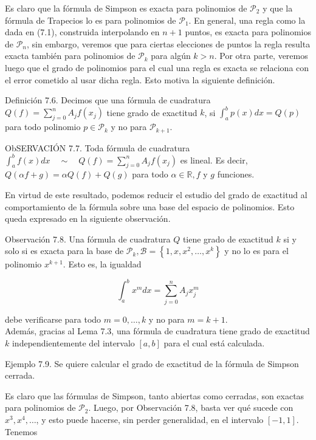 \documentclass[10pt]{article}
\begin{document}
Es claro que la fórmula de Simpson es exacta para polinomios de $\mathcal{P}_{2}$ y que la fórmula de Trapecios lo es para polinomios de $\mathcal{P}_{1}$. En general, una regla como la dada en (7.1), construida interpolando en $n+1$ puntos, es exacta para polinomios de $\mathcal{P}_{n}$, sin embargo, veremos que para ciertas elecciones de puntos la regla resulta exacta también para polinomios de $\mathcal{P}_{k}$ para algún $k>n$. Por otra parte, veremos luego que el grado de polinomios para el cual una regla es exacta se relaciona con el error cometido al usar dicha regla. Esto motiva la siguiente definición.

Definición 7.6. Decimos que una fórmula de cuadratura $Q(f)=\sum_{j=0}^{n} A_{j} f\left(x_{j}\right)$ tiene grado de exactitud $k$, si $\int_{a}^{b} p(x) d x=Q(p)$ para todo polinomio $p \in \mathcal{P}_{k}$ y no para $\mathcal{P}_{k+1}$.

ObSERVACIÓN 7.7. Toda fórmula de cuadratura $\int_{a}^{b} f(x) d x \quad \sim \quad Q(f)=\sum_{j=0}^{n} A_{j} f\left(x_{j}\right)$ es lineal. Es decir, $Q(\alpha f+g)=\alpha Q(f)+Q(g)$ para todo $\alpha \in \mathbb{R}, f$ y $g$ funciones.

En virtud de este resultado, podemos reducir el estudio del grado de exactitud al comportamiento de la fórmula sobre una base del espacio de polinomios. Esto queda expresado en la siguiente observación.

Observación 7.8. Una fórmula de cuadratura $Q$ tiene grado de exactitud $k$ si y solo si es exacta para la base de $\mathcal{P}_{k}, \mathcal{B}=\left\{1, x, x^{2}, \ldots, x^{k}\right\}$ y no lo es para el polinomio $x^{k+1}$. Esto es, la igualdad

$$
\int_{a}^{b} x^{m} d x=\sum_{j=0}^{n} A_{j} x_{j}^{m}
$$

debe verificarse para todo $m=0, \ldots, k$ y no para $m=k+1$.\\
Además, gracias al Lema 7.3, una fórmula de cuadratura tiene grado de exactitud $k$ independientemente del intervalo $[a, b]$ para el cual está calculada.

Ejemplo 7.9. Se quiere calcular el grado de exactitud de la fórmula de Simpson cerrada.

Es claro que las fórmulas de Simpson, tanto abiertas como cerradas, son exactas para polinomios de $\mathcal{P}_{2}$. Luego, por Observación 7.8, basta ver qué sucede con $x^{3}, x^{4}, \ldots$, y esto puede hacerse, sin perder generalidad, en el intervalo $[-1,1]$. Tenemos
\end{document}
